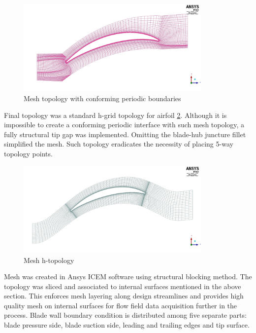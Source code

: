 \begin{figure}[h!]
\centering %
\includegraphics[width=0.85\textwidth]{Pictures/r67_cj.jpg}
\caption{Mesh topology with conforming periodic boundaries}
\label{cj_topo}
\end{figure}

Final topology was a standard h-grid topology for airfoil \ref{h_topo}. Although it is impossible to create a conforming periodic interface with such mesh topology, a fully structural tip gap was implemented. Omitting the blade-hub juncture fillet simplified the mesh.  Such topology eradicates the necessity of placing 5-way topology points.

\begin{figure}[h!]
\centering %
\includegraphics[width=0.85\textwidth]{Pictures/r67_htopo.jpg}
\caption{Mesh h-topology}
\label{h_topo}
\end{figure}

Mesh was created in Ansys ICEM software using structural blocking method. The topology was sliced and associated to internal surfaces mentioned in the above section. This enforces mesh layering along design streamlines and provides high quality mesh on internal surfaces for flow field data acquisition further in the process. Blade wall boundary condition is distributed among five separate parts: blade pressure side, blade suction side, leading and trailing edges and tip surface. 

